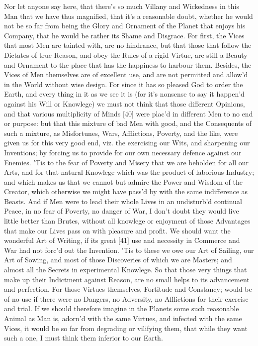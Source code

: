\documentclass[letterpaper]{book}
\begin{document}
Nor let anyone say here, that there's so much Villany and Wickedness in this
Man that we have thus magnified, that it's a reasonable doubt, whether he
would not be so far from being the Glory and Ornament of the Planet that
enjoys his Company, that he would be rather its Shame and Disgrace.  For
first, the Vices that most Men are tainted with, are no hindrance, but that
those that follow the Dictates of true Reason, and obey the Rules of a rigid
Virtue, are still a Beauty and Ornament to the place that has the happiness
to harbour them. Besides, the Vices of Men themselves are of excellent use,
and are not permitted and allow'd in the World without wise design. For
since it has so pleased God to order the Earth, and every thing in it as we
see it is (for it's nonsense to say it happen'd against his Will or
Knowlege) we must not think that those different Opinions, and that various
multiplicity of Minds [40] were plac'd in different Men to no end or
purpose: but that this mixture of bad Men with good, and the Consequents of
such a mixture, as Misfortunes, Wars, Afflictions, Poverty, and the like,
were given us for this very good end, viz. the exercising our Wits, and
sharpening our Inventions; by forcing us to provide for our own necessary
defence against our Enemies.  'Tis to the fear of Poverty and Misery that we
are beholden for all our Arts, and for that natural Knowlege which was the
product of laborious Industry; and which makes us that we cannot but admire
the Power and Wisdom of the Creator, which otherwise we might have pass'd by
with the same indifference as Beasts. And if Men were to lead their whole
Lives in an undisturb'd continual Peace, in no fear of Poverty, no danger of
War, I don't doubt they would live little better than Brutes, without all
knowlege or enjoyment of those Advantages that make our Lives pass on with
pleasure and profit. We should want the wonderful Art of Writing, if its
great [41] use and necessity in Commerce and War had not forc'd out the
Invention.  'Tis to these we owe our Art of Sailing, our Art of Sowing, and
most of those Discoveries of which we are Masters; and almost all the
Secrets in experimental Knowlege. So that those very things that make up
their Indictment against Reason, are no small helps to its advancement and
perfection. For those Virtues themselves, Fortitude and Constancy; would be
of no use if there were no Dangers, no Adversity, no Afflictions for their
exercise and trial.  If we should therefore imagine in the Planets some such
reasonable Animal as Man is, adorn'd with the same Virtues, and infected
with the same Vices, it would be so far from degrading or vilifying them,
that while they want such a one, I must think them inferior to our Earth.
\end{document}
